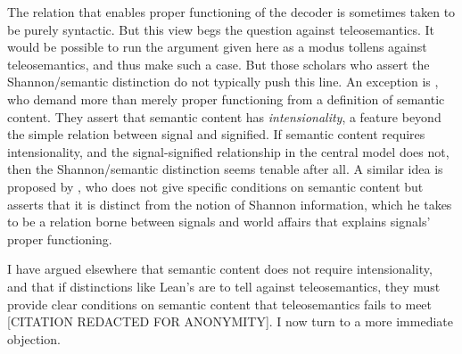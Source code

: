 The relation that enables proper functioning of the decoder is sometimes taken to be purely syntactic.
But this view begs the question against teleosemantics.
It would be possible to run the argument given here as a modus tollens against teleosemantics, and thus make such a case.
But those scholars who assert the Shannon/semantic distinction do not typically push this line.
An exception is \citet[$\S$4]{hutto2013radicalizing}, who demand more than merely proper functioning from a definition of semantic content.
They assert that semantic content has \textit{intensionality}, a feature beyond the simple relation between signal and signified.
If semantic content requires intensionality, and the signal-signified relationship in the central model does not, then the Shannon/semantic distinction seems tenable after all.
A similar idea is proposed by \citet{lean2014shannon}, who does not give specific conditions on semantic content but asserts that it is distinct from the notion of Shannon information, which he takes to be a relation borne between signals and world affairs that explains signals' proper functioning.

I have argued elsewhere that semantic content does not require intensionality, and that if distinctions like Lean's are to tell against teleosemantics, they must provide clear conditions on semantic content that teleosemantics fails to meet [CITATION REDACTED FOR ANONYMITY].
I now turn to a more immediate objection.




